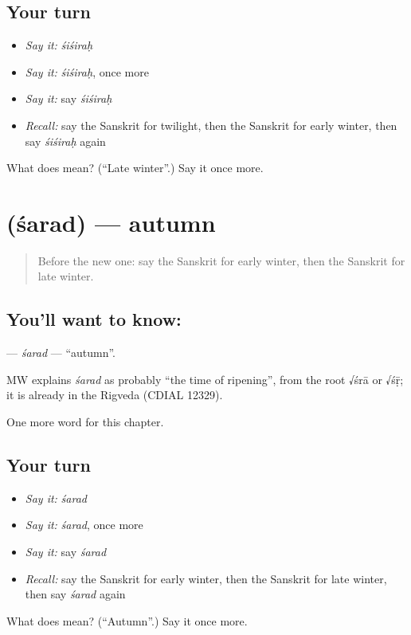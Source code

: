 \subsection*{Your turn}
\begin{itemize}
\raggedright
  \item \emph{Say it:} \emph{śiśiraḥ}
  \item \emph{Say it:} \emph{śiśiraḥ}, once more
  \item \emph{Say it:} say \emph{śiśiraḥ}
  \item \emph{Recall:} say the Sanskrit for twilight, then the Sanskrit for early winter, then say \emph{śiśiraḥ} again
\end{itemize}

\begin{tcolorbox}[breakable,colback=teal!4,colframe=teal!35!black,title={Before you move on}]
What does  mean? (\textquotedblleft{}Late winter\textquotedblright{}.) Say it once more.
\end{tcolorbox}
\section[\texorpdfstring{\sk{शरद्} (śarad)}{शरद् (śarad)}]{ (śarad) — autumn}

\label{lesson:SA-C91-sarad}



\begin{quote}
Before the new one: say the Sanskrit for early winter, then the Sanskrit for late winter.
\end{quote}

\subsection*{You'll want to know: }
\textbf{} — \emph{śarad} — \textquotedblleft{}autumn\textquotedblright{}.

\begin{cousinweb}
MW explains \emph{śarad} as probably \textquotedblleft{}the time of ripening\textquotedblright{}, from the root √śrā or √śṝ; it is already in the Rigveda (CDIAL 12329).
\end{cousinweb}

\begin{grammarlens}[title={What you've built}]
One more word for this chapter.
\end{grammarlens}

\subsection*{Your turn}
\begin{itemize}
\raggedright
  \item \emph{Say it:} \emph{śarad}
  \item \emph{Say it:} \emph{śarad}, once more
  \item \emph{Say it:} say \emph{śarad}
  \item \emph{Recall:} say the Sanskrit for early winter, then the Sanskrit for late winter, then say \emph{śarad} again
\end{itemize}

\begin{tcolorbox}[breakable,colback=teal!4,colframe=teal!35!black,title={Before you move on}]
What does  mean? (\textquotedblleft{}Autumn\textquotedblright{}.) Say it once more.
\end{tcolorbox}
